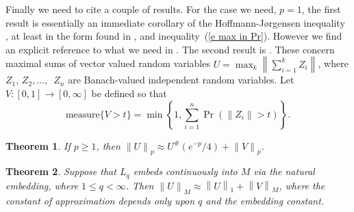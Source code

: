 \documentclass[12pt]{amsart}
\newtheorem{thm}{Theorem}
\newcommand{\normo}[1]{{\left\|#1\right\|}}
\newcommand{\snormo}[1]{{\mathopen\|#1\mathclose\|}}
\newcommand{\measure}{\text{measure}}
\begin{document}
Finally we need to cite a couple of results.
For the case we need, $p=1$, the first result is essentially an 
immediate corollary of the 
Hoffmann-J{\o}rgensen inequality \cite{hoffmann-jorgensen}, at least
in the form found in \cite[Proposition~1.3.2]{kwapien-woyczynski}, 
and inequality~(\ref{e max in Pr}).
However we find an explicit reference to what we need in
\cite[Theorem 6.1]{hitczenko-montgomery-smith}.
The second result is
\cite[Theorem 7.1]{hitczenko-montgomery-smith}.
These concern maximal sums of vector valued random variables
$U = \max_k \normo{\sum_{i=1}^k Z_i}$, where $Z_1$, $Z_2,\dots,$\
$Z_n$ are Banach-valued independent random variables.
Let $V\colon[0,1]\to[0,\infty]$ be defined so that
\[
   \measure\{V>t\} = \min\left\{ 1 ,
   \sum_{i=1}^n \Pr(\snormo{Z_i} > t) \right\} .
\]

\begin{thm}
\label{t lp}
If
$p \ge 1$, 
then
$ \snormo U_p \approx U^\#(e^{-p}/4) + \snormo V_p $.
\end{thm}

\begin{thm}
\label{t r.i.}
Suppose that $L_q$ embeds continuously into $M$ via the natural embedding,
where $1 \le q < \infty$.  
Then
$ \snormo U_M  \approx \normo U_1 + \normo V_M $,
where the constant of approximation depends only upon $q$ and the embedding
constant.
\end{thm}
\end{document}
